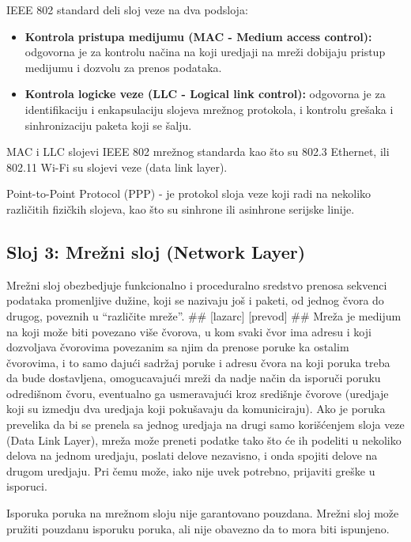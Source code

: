 \documentclass[a4paper,12pt, master]{etf}
\begin{document}
	IEEE 802 standard deli sloj veze na dva podsloja:
	\begin{itemize}
		\item \textbf{Kontrola pristupa medijumu (MAC - Medium access control):}
		odgovorna je za kontrolu na\v{c}ina na koji uredjaji na mre\v{z}i
		dobijaju pristup medijumu i	dozvolu za prenos podataka.
		\item \textbf{Kontrola logicke veze (LLC - Logical link control):}
		odgovorna je za identifikaciju i enkapsulaciju slojeva mre\v{z}nog
		protokola, i kontrolu gre\v{s}aka i sinhronizaciju paketa koji se
		\v{s}alju.
	\end{itemize}

	MAC i LLC slojevi IEEE 802 mre\v{z}nog standarda kao \v{s}to su 802.3
	Ethernet, ili 802.11 Wi-Fi su slojevi veze (data link layer).

	Point-to-Point Protocol (PPP) - je protokol sloja veze koji radi na
	nekoliko razli\v{c}itih	fizi\v{c}kih slojeva, kao \v{s}to su sinhrone ili
	asinhrone serijske linije.

	\subsection{Sloj 3: Mre\v{z}ni sloj (Network Layer)}

	Mre\v{z}ni sloj obezbedjuje funkcionalno i proceduralno sredstvo prenosa
	sekvenci podataka promenljive du\v{z}ine, koji se nazivaju jo\v{s} i paketi,
	od jednog \v{c}vora do drugog, poveznih u ``razli\v{c}ite mre\v{z}e''.
	\#\# [lazarc] [prevod] \#\# Mre\v{z}a je medijum na koji mo\v{z}e biti
	povezano vi\v{s}e \v{c}vorova, u kom svaki \v{c}vor ima adresu i koji
	dozvoljava \v{c}vorovima povezanim sa njim da prenose poruke ka ostalim
	\v{c}vorovima, i to samo daju\'{c}i sadr\v{z}aj poruke i adresu \v{c}vora
	na koji poruka treba da bude dostavljena, omogucavaju\'{c}i mre\v{z}i da
	nadje na\v{c}in da isporu\v{c}i poruku odredi\v{s}nom \v{c}voru, eventualno
	ga usmeravaju\'{c}i kroz sredi\v{s}nje \v{c}vorove (uredjaje koji su
	izmedju dva uredjaja koji poku\v{s}avaju da komuniciraju). Ako je poruka
	prevelika da bi se prenela sa jednog uredjaja na drugi samo
	kori\v{s}\'{c}enjem sloja veze (Data Link Layer), mre\v{z}a mo\v{z}e
	preneti podatke tako \v{s}to \'{c}e ih podeliti u nekoliko delova na jednom
	uredjaju, poslati delove nezavisno, i onda spojiti delove na drugom
	uredjaju. Pri \v{c}emu mo\v{z}e, iako nije uvek potrebno, prijaviti
	gre\v{s}ke u isporuci.

	Isporuka poruka na mre\v{z}nom sloju nije garantovano pouzdana. Mre\v{z}ni
	sloj mo\v{z}e pru\v{z}iti pouzdanu isporuku poruka, ali nije obavezno da to
	mora biti ispunjeno.
\end{document}
